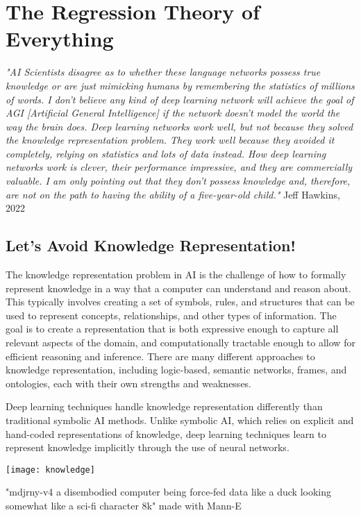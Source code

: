 \setchapterpreamble[u]{\margintoc}
\chapter{The Regression Theory of Everything}

\textit{"AI Scientists disagree as to whether these language networks possess true knowledge or are just mimicking humans by remembering the statistics of millions of words. I don't believe any kind of deep learning network will achieve the goal of AGI [Artificial General Intelligence] if the network doesn't model the world the way the brain does. Deep learning networks work well, but not because they solved the knowledge representation problem. They work well because they avoided it completely, relying on statistics and lots of data instead. How deep learning networks work is clever, their performance impressive, and they are commercially valuable. I am only pointing out that they don't possess knowledge and, therefore, are not on the path to having the ability of a five-year-old child."} Jeff Hawkins, 2022 \cite{hawkins2022}

\section{Let's Avoid Knowledge Representation!}

The knowledge representation problem in AI is the challenge of how to formally represent knowledge in a way that a computer can understand and reason about. This typically involves creating a set of symbols, rules, and structures that can be used to represent concepts, relationships, and other types of information. The goal is to create a representation that is both expressive enough to capture all relevant aspects of the domain, and computationally tractable enough to allow for efficient reasoning and inference. There are many different approaches to knowledge representation, including logic-based, semantic networks, frames, and ontologies, each with their own strengths and weaknesses.

Deep learning techniques handle knowledge representation differently than traditional symbolic AI methods. Unlike symbolic AI, which relies on explicit and hand-coded representations of knowledge, deep learning techniques learn to represent knowledge implicitly through the use of neural networks.


\begin{marginfigure}[-5.5cm]
        \texttt{[image: knowledge]}
        \caption{"mdjrny-v4 a disembodied computer being force-fed data like a duck looking somewhat like a sci-fi character 8k" made with Mann-E}
\end{marginfigure}


